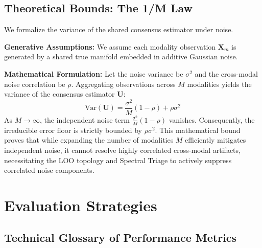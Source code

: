 \documentclass[
  letterpaper,
]{report}
\begin{document}
\subsection{Theoretical Bounds: The 1/M
Law}\label{theoretical-bounds-the-1m-law}

We formalize the variance of the shared consensus estimator under noise.

\textbf{Generative Assumptions:} We assume each modality observation
\(\mathbf{X}_m\) is generated by a shared true manifold embedded in
additive Gaussian noise.

\textbf{Mathematical Formulation:} Let the noise variance be
\(\sigma^2\) and the cross-modal noise correlation be \(\rho\).
Aggregating observations across \(M\) modalities yields the variance of
the consensus estimator \(\mathbf{U}\):
\[ \text{Var}(\mathbf{U}) = \frac{\sigma^2}{M} (1 - \rho) + \rho \sigma^2 \]
As \(M \to \infty\), the independent noise term
\(\frac{\sigma^2}{M}(1-\rho)\) vanishes. Consequently, the irreducible
error floor is strictly bounded by \(\rho \sigma^2\). This mathematical
bound proves that while expanding the number of modalities \(M\)
efficiently mitigates independent noise, it cannot resolve highly
correlated cross-modal artifacts, necessitating the LOO topology and
Spectral Triage to actively suppress correlated noise components.

\section{Evaluation Strategies}\label{evaluation-strategies}

\subsection{Technical Glossary of Performance
Metrics}\label{technical-glossary-of-performance-metrics}
\end{document}
